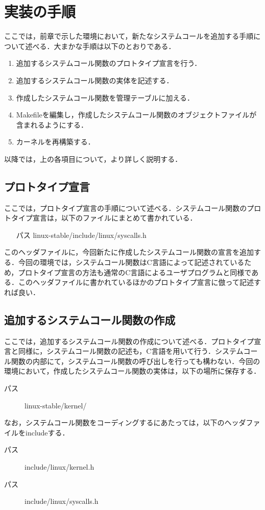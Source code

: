 \documentclass[12pt]{jsarticle}
\begin{document}
\section{実装の手順}
ここでは，前章で示した環境において，新たなシステムコールを追加する手順について述べる．大まかな手順は以下のとおりである．
\begin{enumerate}
\item 追加するシステムコール関数のプロトタイプ宣言を行う．
\item 追加するシステムコール関数の実体を記述する．
\item 作成したシステムコール関数を管理テーブルに加える．
\item Makefileを編集し，作成したシステムコール関数のオブジェクトファイルが含まれるようにする．
\item カーネルを再構築する．
\end{enumerate}
以降では，上の各項目について，より詳しく説明する．

\subsection{プロトタイプ宣言}
ここでは，プロトタイプ宣言の手順について述べる．システムコール関数のプロトタイプ宣言は，以下のファイルにまとめて書かれている．
\begin{itemize}
\item [パス] linux-stable\slash{}include\slash{}linux\slash{}syscalls.h
\end{itemize}
このヘッダファイルに，今回新たに作成したシステムコール関数の宣言を追加する．今回の環境では，システムコール関数はC言語によって記述されているため，プロトタイプ宣言の方法も通常のC言語によるユーザプログラムと同様である．このヘッダファイルに書かれているほかのプロトタイプ宣言に倣って記述すれば良い．

\subsection{追加するシステムコール関数の作成}
ここでは，追加するシステムコール関数の作成について述べる．プロトタイプ宣言と同様に，システムコール関数の記述も，C言語を用いて行う．システムコール関数の内部にて，システムコール関数の呼び出しを行っても構わない．今回の環境において，作成したシステムコール関数の実体は，以下の場所に保存する．
\begin{description}
\item [パス] linux-stable\slash{}kernel\slash{}
\end{description}
なお，システムコール関数をコーディングするにあたっては，以下のヘッダファイルをincludeする．
\begin{description}
\item [パス] include\slash{}linux\slash{}kernel.h
\end{description}
\begin{description}
\item [パス] include\slash{}linux\slash{}syscalls.h
\end{description}
\end{document}
